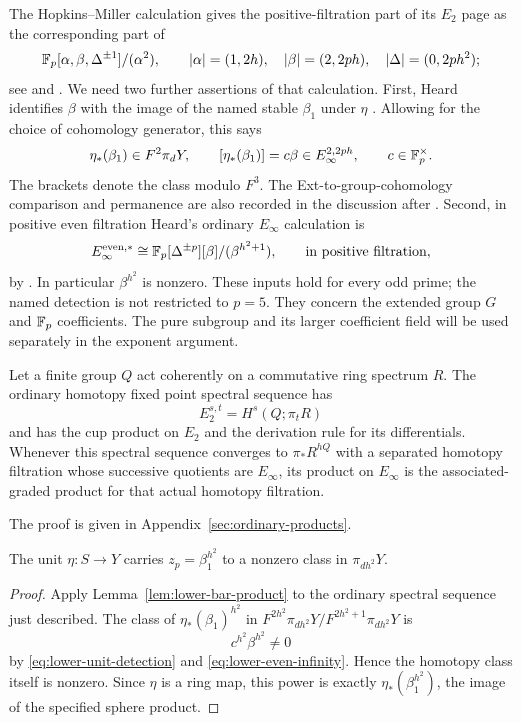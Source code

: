 The Hopkins--Miller calculation gives the positive-filtration part of
its $E_2$ page as the corresponding part of
\[
 \mathbb F_p[\alpha,\beta,\Delta^{\pm1}]/(\alpha^2),\qquad
 |\alpha|=(1,2h),\quad |\beta|=(2,2ph),\quad
 |\Delta|=(0,2ph^2);
\]
see \cite[Proposition~5.5]{heard2015} and
\cite[Proposition~2.7]{hms2017}. We need two further assertions of that
calculation. First, Heard identifies $\beta$ with the image of the
named stable $\beta_1$ under $\eta$
\cite[proof of Theorem~5.6]{heard2015}. Allowing for the choice of
cohomology generator, this says
\begin{equation}\label{eq:lower-unit-detection}
 \eta_*(\beta_1)\in F^2\pi_dY,\qquad
 [\eta_*(\beta_1)]=c\beta\in E_\infty^{2,2ph},
 \qquad c\in\mathbb F_p^\times.
\end{equation}
The brackets denote the class modulo $F^3$. The Ext-to-group-cohomology
comparison and permanence are also recorded in the discussion after
\cite[Proposition~2.7]{hms2017}. Second, in positive even filtration
Heard's ordinary $E_\infty$ calculation is
\begin{equation}\label{eq:lower-even-infinity}
 E_\infty^{\mathrm{even},*}
   \cong \mathbb F_p[\Delta^{\pm p}][\beta]/(\beta^{h^2+1}),
 \qquad \text{in positive filtration},
\end{equation}
by \cite[Lemma~5.8]{heard2015}. In particular $\beta^{h^2}$ is
nonzero. These inputs hold for every odd prime; the named detection
is not restricted to $p=5$. They concern the extended group $G$ and
$\mathbb F_p$ coefficients. The pure subgroup and its larger coefficient
field will be used separately in the exponent argument.

\begin{lemma}\label{lem:lower-bar-product}
Let a finite group $Q$ act coherently on a commutative ring spectrum $R$.
The ordinary homotopy fixed point spectral sequence has
\[
 E_2^{s,t}=H^s(Q;\pi_tR)
\]
and has the cup product on $E_2$ and the derivation rule for its
differentials. Whenever this spectral sequence converges to
$\pi_*R^{hQ}$ with a separated homotopy filtration whose successive
quotients are $E_\infty$, its product on $E_\infty$ is the
associated-graded product for that actual homotopy filtration.
\end{lemma}

The proof is given in Appendix~\ref{sec:ordinary-products}.

\begin{proposition}
\label{prop:lower-power}
The unit $\eta:S\to Y$ carries $z_p=\beta_1^{h^2}$ to a nonzero
class in $\pi_{dh^2}Y$.
\end{proposition}
\begin{proof}
Apply Lemma~\ref{lem:lower-bar-product} to the ordinary spectral
sequence just described. The class of $\eta_*(\beta_1)^{h^2}$ in
$F^{2h^2}\pi_{dh^2}Y/F^{2h^2+1}\pi_{dh^2}Y$ is
\[
 c^{h^2}\beta^{h^2}\ne0
\]
by \eqref{eq:lower-unit-detection} and
\eqref{eq:lower-even-infinity}. Hence the homotopy class itself is
nonzero. Since $\eta$ is a ring map, this power is exactly
$\eta_*(\beta_1^{h^2})$, the image of the specified sphere product.
\end{proof}

